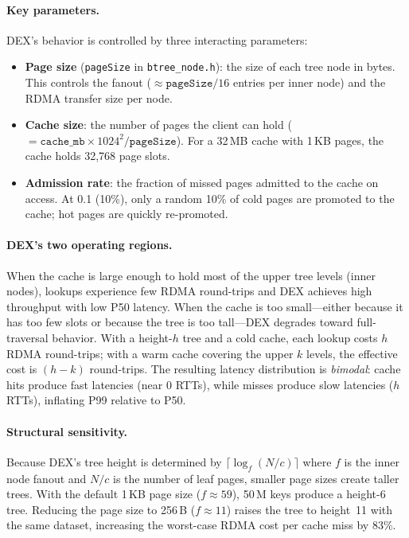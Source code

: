 \documentclass[sigconf, nonacm]{acmart}
\begin{document}
\paragraph{Key parameters.}
DEX's behavior is controlled by three interacting parameters:
\begin{itemize}
  \item \textbf{Page size} (\texttt{pageSize} in \texttt{btree\_node.h}): the size of each tree node in bytes. This controls the fanout ($\approx \texttt{pageSize}/16$ entries per inner node) and the RDMA transfer size per node.
  \item \textbf{Cache size}: the number of pages the client can hold ($= \texttt{cache\_mb} \times 1024^2 / \texttt{pageSize}$). For a 32\,MB cache with 1\,KB pages, the cache holds 32,768 page slots.
  \item \textbf{Admission rate}: the fraction of missed pages admitted to the cache on access. At 0.1 (10\%), only a random 10\% of cold pages are promoted to the cache; hot pages are quickly re-promoted.
\end{itemize}

\paragraph{DEX's two operating regions.}
When the cache is large enough to hold most of the upper tree levels (inner nodes), lookups experience few RDMA round-trips and DEX achieves high throughput with low P50 latency. When the cache is too small---either because it has too few slots or because the tree is too tall---DEX degrades toward full-traversal behavior. With a height-$h$ tree and a cold cache, each lookup costs $h$ RDMA round-trips; with a warm cache covering the upper $k$ levels, the effective cost is $(h{-}k)$ round-trips. The resulting latency distribution is \emph{bimodal}: cache hits produce fast latencies (near 0 RTTs), while misses produce slow latencies ($h$ RTTs), inflating P99 relative to P50.

\paragraph{Structural sensitivity.}
Because DEX's tree height is determined by $\lceil \log_f(N/c) \rceil$ where $f$ is the inner node fanout and $N/c$ is the number of leaf pages, smaller page sizes create taller trees. With the default 1\,KB page size ($f \approx 59$), 50\,M keys produce a height-6 tree. Reducing the page size to 256\,B ($f \approx 11$) raises the tree to height~11 with the same dataset, increasing the worst-case RDMA cost per cache miss by $83$\%.
\end{document}
